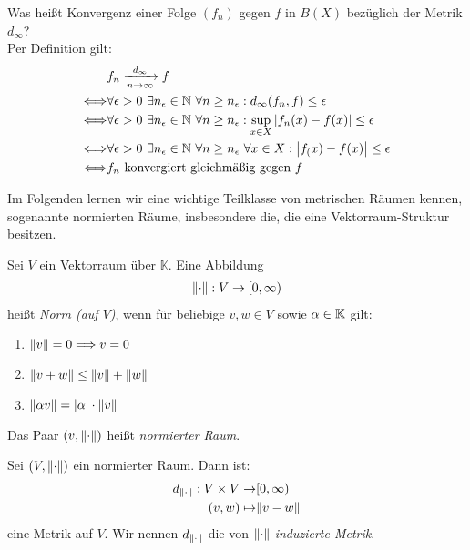 \begin{Beispiel}{
	Was heißt Konvergenz einer Folge $(f_n)$ gegen $f$ in $B(X)$ bezüglich der 
	Metrik $d_\infty$?\\
	Per Definition gilt:
	\begin{align*}
		& f_n \xrightarrow[n \to \infty]{d_\infty} f \\
		\Longleftrightarrow & \forall \epsilon > 0 \text{ } \exists n_\epsilon \in \mathbb{N} \text{ }\forall n \geq 
			n_\epsilon: d_\infty(f_n,f) \leq \epsilon \\
		\Longleftrightarrow & \forall \epsilon > 0 \text{ } \exists n_\epsilon \in \mathbb{N} \text{ }
			\forall n \geq  n_\epsilon: \sup_{x \in X} \abs{f_n(x)-f(x)} \leq 
			\epsilon \\
		\Longleftrightarrow & \forall \epsilon > 0 \text{ } \exists n_\epsilon \in 
			\mathbb{N} \text{ }\forall n \geq n_\epsilon \text{ }\forall x \in X: 
			\abs{f_(x) -f(x)} \leq \epsilon \\
		\Longleftrightarrow & f_n \text{ konvergiert gleichmäßig gegen } f
	\end{align*}
}\end{Beispiel}

Im Folgenden lernen wir eine wichtige Teilklasse von metrischen Räumen kennen, sogenannte
normierten Räume, insbesondere die, die eine Vektorraum-Struktur besitzen.

\begin{Definition}{%
	Sei $V$ ein Vektorraum über $\mathbb{K}$. Eine Abbildung 
	\begin{align*}
		\norm{\cdot} : V \rightarrow [0, \infty)
	\end{align*}
	heißt \emph{Norm (auf $V$)}, wenn für beliebige $v,w\in V$ sowie $\alpha \in \mathbb{K}$ gilt:
	\begin{enumerate}[label=\subscript{N}{{\arabic*}}]
		\item \label{def:norm:1} $\norm{v} = 0 \Longrightarrow v = 0$
		\item \label{def:norm:2} $ \norm{v + w} \leq \norm{v} + \norm{w}$
		\item \label{def:norm:3} $\norm{\alpha v} = \abs{\alpha}\cdot\norm{v}$
	\end{enumerate}
	Das Paar $(v, \norm{\cdot})$ heißt \emph{normierter Raum}.
}\end{Definition}

\begin{Definition}{%
	Sei $(V, \norm{\cdot})$ ein normierter Raum. Dann ist:
	\begin{align*}
		d_{\norm{\cdot}} : V \times V \to & [0, \infty) \\
			(v,w) \mapsto & \norm{v-w}
	\end{align*}
	eine Metrik auf $V$. Wir nennen $d_{\norm{\cdot}}$ die von $\norm{\cdot}$ 
	\emph{induzierte Metrik}.
}\end{Definition}

